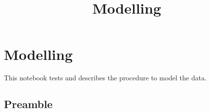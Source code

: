 \documentclass[11pt]{article}
\title{Modelling}
\begin{document}
    
    
    \maketitle
    
    

    
    \hypertarget{modelling}{%
\section{Modelling}\label{modelling}}

This notebook tests and describes the procedure to model the data.

    \hypertarget{preamble}{%
\subsection{Preamble}\label{preamble}}
\end{document}

